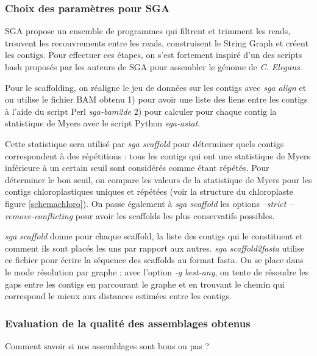 \documentclass[a4paper]{article}
\begin{document}

\subsubsection{Choix des paramètres pour SGA}

SGA propose un ensemble de programmes qui filtrent et trimment les reads, trouvent les recouvrements entre les reads, construisent le String Graph et créent les contigs. Pour effectuer ces étapes, on s'est fortement inspiré d'un des scripts bash proposés par les auteurs de SGA pour assembler le génome de \textit{C. Elegans}. 

Pour le scaffolding, on réaligne le jeu de données sur les contigs avec \textit{sga align} et on utilise le fichier BAM obtenu 1)
pour avoir une liste des liens entre les contigs à l'aide du script Perl \textit{sga-bam2de} 2) pour calculer pour chaque contig la statistique de Myers avec le script Python \textit{sga-astat}. 

Cette statistique sera utilisé par \textit{sga scaffold} pour déterminer quels contigs correspondent à des répétitions : tous les contigs qui ont une statistique de Myers inférieure à un certain seuil sont considérés comme étant répétés. Pour déterminer le bon seuil, on compare les valeurs de la statistique de Myers pour les contigs chloroplastiques uniques et répétées (voir la structure du chloroplaste figure \ref{schemachloro}). On passe également à \textit{sga scaffold} les options \textit{--strict --remove-conflicting} pour avoir les scaffolds les plus conservatifs possibles. 

\textit{sga scaffold} donne pour chaque scaffold, la liste des contigs qui le constituent et comment ils sont placés les uns par rapport aux autres. \textit{sga scaffold2fasta} utilise ce fichier pour écrire la séquence des scaffolds au format fasta. On se place dans le mode résolution par graphe ; avec l'option \textit{-g best-any}, on tente de résoudre les gaps entre les contigs en parcourant le graphe et en trouvant le chemin qui correspond le mieux aux distances estimées entre les contigs. 

\subsubsection{Evaluation de la qualité des assemblages obtenus}

\vspace{0.2cm}

Comment savoir si nos assemblages sont bons ou pas ? \\
\end{document}
